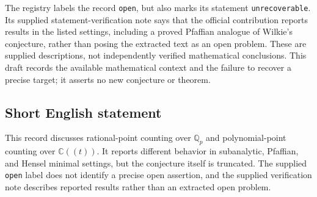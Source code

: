 \documentclass[11pt]{article}
\newcommand{\Q}{\mathbb{Q}}
\newcommand{\C}{\mathbb{C}}
\begin{document}
The registry labels the record \texttt{open}, but also marks its statement \texttt{unrecoverable}. Its supplied statement-verification note says that the official contribution reports results in the listed settings, including a proved Pfaffian analogue of Wilkie's conjecture, rather than posing the extracted text as an open problem. These are supplied descriptions, not independently verified mathematical conclusions. This draft records the available mathematical context and the failure to recover a precise target; it asserts no new conjecture or theorem.
\subsection{Short English statement}
This record discusses rational-point counting over \(\Q_p\) and polynomial-point counting over \(\C((t))\). It reports different behavior in subanalytic, Pfaffian, and Hensel minimal settings, but the conjecture itself is truncated. The supplied \texttt{open} label does not identify a precise open assertion, and the supplied verification note describes reported results rather than an extracted open problem.
\end{document}
